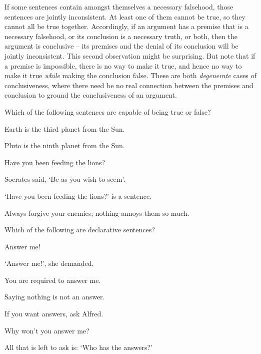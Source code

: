 If some sentences contain amongst themselves a necessary falsehood, those sentences are jointly inconsistent. At least one of them cannot be true, so they cannot all be true together. Accordingly, if an argument has a premise that is a necessary falsehood, or its conclusion is a necessary truth, or both, then the argument is conclusive – its premises and the denial of its conclusion will be jointly inconsistent.  This second observation might be surprising. But note that if a premise is impossible, there is no way to make it true, and hence no way to make it true \emph{while} making the conclusion false. These are both \emph{degenerate} cases of conclusiveness, where there need be no real connection between the premises and conclusion to ground the conclusiveness of an argument.



\practiceproblems
\problempart Which of the following sentences are capable of being true or false?
\begin{earg}
	\item Earth is the third planet from the Sun.
	\item Pluto is the ninth planet from the Sun.
	\item Have you been feeding the lions?
	\item Socrates said, `Be as you wish to seem'.
	\item `Have you been feeding the lions?' is a sentence.
	\item Always forgive your enemies; nothing annoys them so much.
\end{earg}

\problempart Which of the following are declarative sentences?
\begin{earg}
	\item Answer me!
	\item `Answer me!', she demanded.
	\item You are required to answer me.
	\item Saying nothing is not an answer.
	\item If you want answers, ask Alfred.
	\item Why won't you answer me?
	\item All that is left to ask is: `Who has the answers?'
\end{earg}

